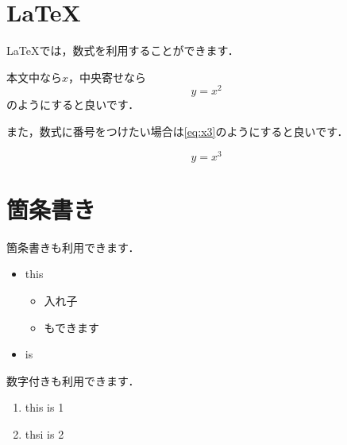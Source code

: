 \section{LaTeX}

LaTeXでは，数式を利用することができます．

本文中なら\(x\)，中央寄せなら\[y = x^2\]のようにすると良いです．

また，数式に番号をつけたい場合は\ref{eq:x3}のようにすると良いです．

\begin{equation}
    y = x^3
    \label{eq:x3}
\end{equation}

\section{箇条書き}

箇条書きも利用できます．

\begin{itemize}
    \item this
    \begin{itemize}
        \item 入れ子
        \item もできます
    \end{itemize}
    \item is
\end{itemize}

数字付きも利用できます．

\begin{enumerate}
    \item this is 1
    \item thsi is 2
\end{enumerate}